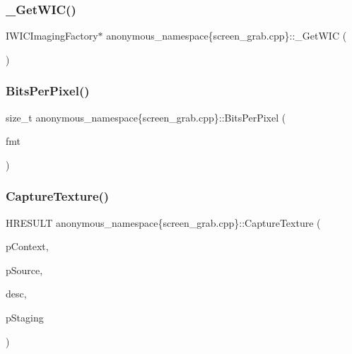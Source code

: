 \subsubsection{\texorpdfstring{\+\_\+\+Get\+W\+I\+C()}{\_GetWIC()}}
{\footnotesize\ttfamily I\+W\+I\+C\+Imaging\+Factory$\ast$ anonymous\+\_\+namespace\{screen\+\_\+grab.\+cpp\}\+::\+\_\+\+Get\+W\+IC (\begin{DoxyParamCaption}{ }\end{DoxyParamCaption})}

\mbox{\label{namespaceanonymous__namespace_02screen__grab_8cpp_03_a1237e85d6137361bff996e57731a4084}} 
\subsubsection{\texorpdfstring{Bits\+Per\+Pixel()}{BitsPerPixel()}}
{\footnotesize\ttfamily size\+\_\+t anonymous\+\_\+namespace\{screen\+\_\+grab.\+cpp\}\+::Bits\+Per\+Pixel (\begin{DoxyParamCaption}\item[{\+\_\+\+In\+\_\+ D\+X\+G\+I\+\_\+\+F\+O\+R\+M\+AT}]{fmt }\end{DoxyParamCaption})}

\mbox{\label{namespaceanonymous__namespace_02screen__grab_8cpp_03_a65cdb5191a2bc3cc789e789320c97656}} 
\subsubsection{\texorpdfstring{Capture\+Texture()}{CaptureTexture()}}
{\footnotesize\ttfamily H\+R\+E\+S\+U\+LT anonymous\+\_\+namespace\{screen\+\_\+grab.\+cpp\}\+::Capture\+Texture (\begin{DoxyParamCaption}\item[{\+\_\+\+In\+\_\+ I\+D3\+D11\+Device\+Context $\ast$}]{p\+Context,  }\item[{\+\_\+\+In\+\_\+ I\+D3\+D11\+Resource $\ast$}]{p\+Source,  }\item[{D3\+D11\+\_\+\+T\+E\+X\+T\+U\+R\+E2\+D\+\_\+\+D\+E\+SC \&}]{desc,  }\item[{Com\+Ptr$<$ I\+D3\+D11\+Texture2D $>$ \&}]{p\+Staging }\end{DoxyParamCaption})}

